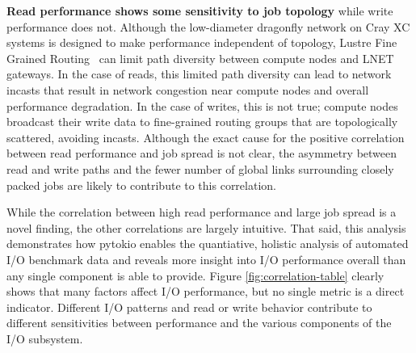 \textbf{Read performance shows some sensitivity to job topology} while write performance does not.
Although the low-diameter dragonfly network on Cray XC systems is designed to make performance independent of topology, Lustre Fine Grained Routing~\cite{Dillow2011} can limit path diversity between compute nodes and LNET gateways.
In the case of reads, this limited path diversity can lead to network incasts that result in network congestion near compute nodes and overall performance degradation.
In the case of writes, this is not true; compute nodes broadcast their write data to fine-grained routing groups that are topologically scattered, avoiding incasts.
Although the exact cause for the positive correlation between read performance and job spread is not clear, the asymmetry between read and write paths and the fewer number of global links surrounding closely packed jobs are likely to contribute to this correlation.

While the correlation between high read performance and large job spread is a novel finding, the other correlations are largely intuitive.
That said, this analysis demonstrates how pytokio enables the quantiative, holistic analysis of automated I/O benchmark data and reveals more insight into I/O performance overall than any single component is able to provide.
Figure \ref{fig:correlation-table} clearly shows that many factors affect I/O performance, but no single metric is a direct indicator.
Different I/O patterns and read or write behavior contribute to different sensitivities between performance and the various components of the I/O subsystem.